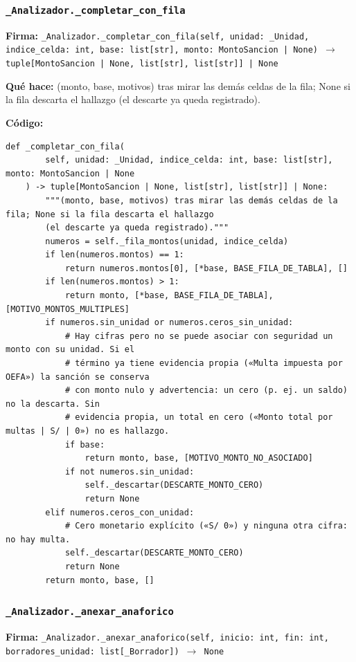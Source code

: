 \documentclass[11pt,a4paper]{article}
\begin{document}
\subsubsection*{\texttt{\_Analizador.\_completar\_con\_fila}}
\textbf{Firma:} \texttt{\_Analizador.\_completar\_con\_fila(self, unidad: \_Unidad, indice\_celda: int, base: list[str], monto: MontoSancion | None) $\rightarrow$ tuple[MontoSancion | None, list[str], list[str]] | None}

\textbf{Qué hace:} (monto, base, motivos) tras mirar las demás celdas de la fila; None si la fila descarta el hallazgo
(el descarte ya queda registrado).

\textbf{Código:}
\begin{lstlisting}
def _completar_con_fila(
        self, unidad: _Unidad, indice_celda: int, base: list[str], monto: MontoSancion | None
    ) -> tuple[MontoSancion | None, list[str], list[str]] | None:
        """(monto, base, motivos) tras mirar las demás celdas de la fila; None si la fila descarta el hallazgo
        (el descarte ya queda registrado)."""
        numeros = self._fila_montos(unidad, indice_celda)
        if len(numeros.montos) == 1:
            return numeros.montos[0], [*base, BASE_FILA_DE_TABLA], []
        if len(numeros.montos) > 1:
            return monto, [*base, BASE_FILA_DE_TABLA], [MOTIVO_MONTOS_MULTIPLES]
        if numeros.sin_unidad or numeros.ceros_sin_unidad:
            # Hay cifras pero no se puede asociar con seguridad un monto con su unidad. Si el
            # término ya tiene evidencia propia («Multa impuesta por OEFA») la sanción se conserva
            # con monto nulo y advertencia: un cero (p. ej. un saldo) no la descarta. Sin
            # evidencia propia, un total en cero («Monto total por multas | S/ | 0») no es hallazgo.
            if base:
                return monto, base, [MOTIVO_MONTO_NO_ASOCIADO]
            if not numeros.sin_unidad:
                self._descartar(DESCARTE_MONTO_CERO)
                return None
        elif numeros.ceros_con_unidad:
            # Cero monetario explícito («S/ 0») y ninguna otra cifra: no hay multa.
            self._descartar(DESCARTE_MONTO_CERO)
            return None
        return monto, base, []
\end{lstlisting}

\subsubsection*{\texttt{\_Analizador.\_anexar\_anaforico}}
\textbf{Firma:} \texttt{\_Analizador.\_anexar\_anaforico(self, inicio: int, fin: int, borradores\_unidad: list[\_Borrador]) $\rightarrow$ None}
\end{document}
